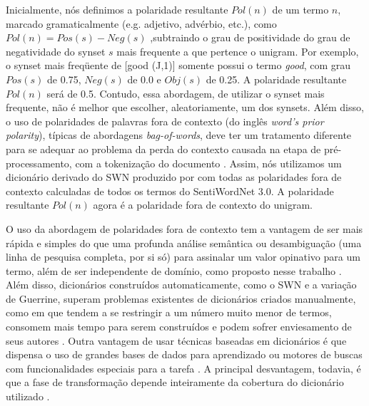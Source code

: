 Inicialmente, nós definimos a polaridade resultante $Pol(n)$ de um termo  $n$, marcado gramaticalmente (e.g. adjetivo, advérbio, etc.), como $Pol(n) = Pos(s) - Neg(s)$ ,subtraindo o grau de positividade do grau de negatividade do synset $s$ mais frequente a que pertence o unigram. Por exemplo, o synset mais freqüente de [good (J,1)] somente possui o termo \textit{good}, com grau $Pos(s)$ de 0.75, $Neg(s)$ de 0.0 e $Obj(s)$ de 0.25. A polaridade resultante $Pol(n)$ será de 0.5. Contudo, essa abordagem, de utilizar o synset mais frequente, não é melhor que escolher, aleatoriamente, um dos synsets.   Além disso, o uso de polaridades de palavras fora de contexto (do inglês \textit{word’s prior polarity}), típicas de abordagens \textit{bag-of-words}, deve ter um tratamento diferente para se adequar ao problema da perda do contexto causada na etapa de pré-processamento, com a tokenização do documento  \cite{guerini2013sentiment}. Assim, nós utilizamos um dicionário derivado do SWN produzido por  \cite{guerini2013sentiment} com todas as polaridades fora de contexto calculadas de todos os termos do SentiWordNet 3.0. A polaridade resultante $Pol(n)$ agora é a polaridade fora de contexto do unigram. 

O uso da abordagem de polaridades fora de contexto tem a vantagem de ser mais rápida e simples do que uma profunda análise semântica ou desambiguação (uma linha de pesquisa completa, por si só) para assinalar um valor opinativo para um termo, além de ser independente de domínio, como proposto nesse trabalho \cite{guerini2013sentiment}. Além disso, dicionários construídos automaticamente, como o SWN e a variação de Guerrine, superam problemas existentes de dicionários criados manualmente, como em \cite{taboada2008extracting, taboada2011lexicon} que tendem a se restringir a um número muito menor de termos, consomem mais tempo para serem construídos e podem sofrer enviesamento de seus autores \cite{ohana2009sentiment}. Outra vantagem de usar técnicas baseadas em dicionários é que dispensa o uso de grandes bases de dados para aprendizado ou motores de buscas com funcionalidades especiais para a tarefa \cite{khan2011sentiment}. A principal desvantagem, todavia, é que a fase de  transformação depende inteiramente da cobertura do dicionário utilizado \cite{khan2011sentiment}. 

